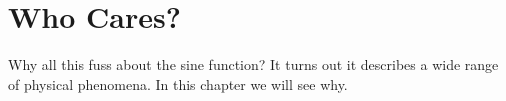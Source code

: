 \chapter{Who Cares?}

Why all this fuss about the sine function? It turns out it describes a wide
range of physical phenomena. In this chapter we will see why.

